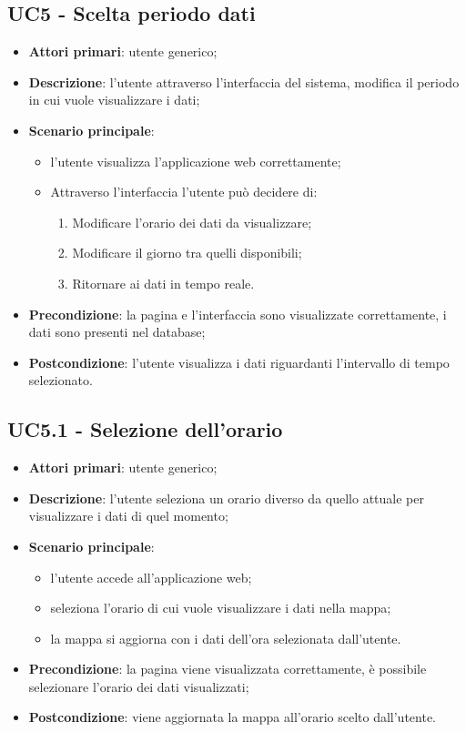 \subsection{UC5 - Scelta periodo dati}
\begin{itemize}
\item \textbf{Attori primari}: utente generico;
\item \textbf{Descrizione}: l’utente attraverso l’interfaccia del sistema, modifica il periodo in cui vuole visualizzare i dati;
\item \textbf{Scenario principale}: 
	\begin{itemize}
		\item l’utente visualizza l’applicazione web correttamente;
		\item Attraverso l’interfaccia l’utente può decidere di:
			\begin{enumerate}
				\item Modificare l’orario dei dati da visualizzare;
				\item Modificare il giorno tra quelli disponibili;
				\item Ritornare ai dati in tempo reale.
			\end{enumerate}
	\end{itemize}
\item \textbf{Precondizione}: la pagina e l’interfaccia sono visualizzate correttamente, i dati sono presenti nel database;
\item \textbf{Postcondizione}: l’utente visualizza i dati riguardanti l’intervallo di tempo selezionato.
\end{itemize}

\subsection{UC5.1 - Selezione dell'orario}
\begin{itemize}
	\item \textbf{Attori primari}: utente generico;
	\item \textbf{Descrizione}: l’utente seleziona un orario diverso da quello attuale per visualizzare i dati di quel momento;
	\item \textbf{Scenario principale}:
		\begin{itemize}
			\item l’utente accede all’applicazione web;
			\item seleziona l’orario di cui vuole visualizzare i dati nella mappa;
			\item la mappa si aggiorna con i dati dell’ora selezionata dall’utente.
		\end{itemize}
	\item \textbf{Precondizione}: la pagina viene visualizzata correttamente, è possibile selezionare l’orario dei dati visualizzati;
	\item \textbf{Postcondizione}: viene aggiornata la mappa all’orario scelto dall’utente.
\end{itemize}

